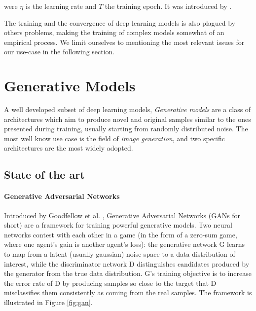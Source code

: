 were $\eta$ is the learning rate and $T$ the training epoch.
It was introduced by \cite{https://doi.org/10.48550/arxiv.1608.03983}.

The training and the convergence of deep learning models is also plagued by others problems, making the training of complex models somewhat of an empirical process. We limit ourselves to mentioning the most relevant issues for our use-case in the following section.

\section{Generative Models} 

A well developed subset of deep learning models, \emph{Generative models} are a class of architectures which aim to produce novel and original samples similar to the ones presented during training, usually starting from randomly distributed noise. The most well know use case is the field of \emph{image generation}, and two specific architectures are the most widely adopted.

\subsection{State of the art}

\paragraph{Generative Adversarial Networks}

Introduced by Goodfellow et al. \cite{gan}, Generative Adversarial Networks (GANs for short) are a framework for training powerful generative models. Two neural networks contest with each other in a game (in the form of a zero-sum game, where one agent's gain is another agent's loss): the generative network G learns to map from a latent (usually gaussian) noise space to a data distribution of interest, while the discriminator network D distinguishes candidates produced by the generator from the true data distribution. G's training objective is to increase the error rate of D by producing samples so close to the target that D misclassifies them consistently as coming from the real samples. The framework is illustrated in Figure \ref{fig:gan}.



